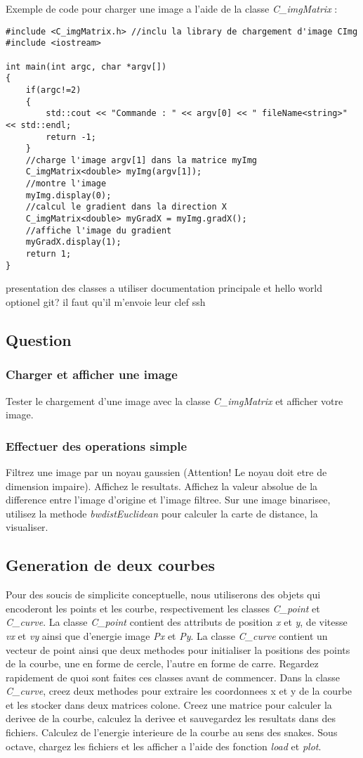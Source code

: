 \documentclass[10pt,a4paper]{article}
\begin{document}
Exemple de code pour charger une image a l'aide de la classe \textit{C\_imgMatrix} : 
\begin{verbatim}
#include <C_imgMatrix.h> //inclu la library de chargement d'image CImg
#include <iostream>

int main(int argc, char *argv[])
{
    if(argc!=2)
    {
        std::cout << "Commande : " << argv[0] << " fileName<string>" << std::endl;
        return -1;
    }
    //charge l'image argv[1] dans la matrice myImg
    C_imgMatrix<double> myImg(argv[1]);
    //montre l'image
    myImg.display(0);
    //calcul le gradient dans la direction X
    C_imgMatrix<double> myGradX = myImg.gradX();
    //affiche l'image du gradient
    myGradX.display(1);
    return 1;
}
\end{verbatim}




presentation des classes a utiliser documentation principale et hello world
optionel git? il faut qu'il m'envoie leur clef ssh
\subsection{Question}
\subsubsection{Charger et afficher une image}
Tester le chargement d'une image avec la classe \textit{C\_imgMatrix} et afficher votre image.
\subsubsection{Effectuer des operations simple}
Filtrez une image par un noyau gaussien (Attention! Le noyau doit etre de dimension impaire). Affichez le resultats. Affichez la valeur absolue de la difference entre l'image d'origine et l'image filtree. Sur une image binarisee, utilisez la methode \textit{bwdistEuclidean} pour calculer la carte de distance, la visualiser.

\subsection{Generation de deux courbes}
Pour des soucis de simplicite conceptuelle, nous utiliserons des objets qui encoderont les points et les courbe, respectivement les classes \textit{C\_point} et \textit{C\_curve}. La classe \textit{C\_point} contient des attributs de position \textit{x} et \textit{y}, de vitesse \textit{vx} et \textit{vy} ainsi que d'energie image \textit{Px} et \textit{Py}. La classe \textit{C\_curve} contient un vecteur de point ainsi que deux methodes pour initialiser la positions des points de la courbe, une en forme de cercle, l'autre en forme de carre. Regardez rapidement de quoi sont faites ces classes avant de commencer.
Dans la classe \textit{C\_curve}, creez deux methodes pour extraire les coordonnees x et y de la courbe et les stocker dans deux matrices colone. Creez une matrice pour calculer la derivee de la courbe, calculez la derivee et sauvegardez les resultats dans des fichiers. Calculez de l'energie interieure de la courbe au sens des snakes. Sous octave, chargez les fichiers et les afficher a l'aide des fonction \textit{load} et \textit{plot}.
\end{document}
